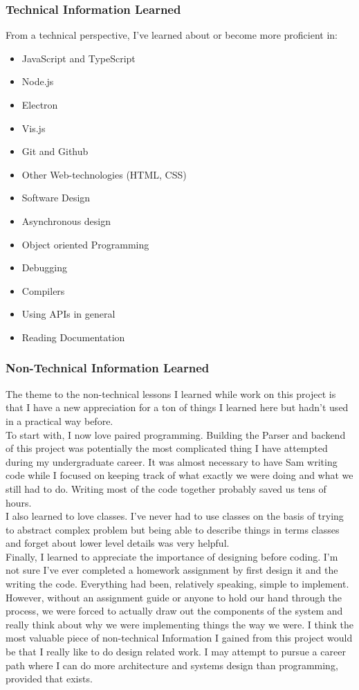 \documentclass[letterpaper,10pt,titlepage,draftclsnofoot,onecolumn,onesided] {IEEEtran}
\begin{document}
\subsubsection{Technical Information Learned}
From a technical perspective, I've learned about or become more proficient in:
\begin{itemize}
    \item JavaScript and TypeScript
    \item Node.js
    \item Electron
    \item Vis.js
    \item Git and Github
    \item Other Web-technologies (HTML, CSS)
    \item Software Design
    \item Asynchronous design
    \item Object oriented Programming
    \item Debugging
    \item Compilers
    \item Using APIs in general
    \item Reading Documentation
\end{itemize}

\subsubsection{Non-Technical Information Learned}
The theme to the non-technical lessons I learned while work on this project is that I have a new appreciation for a ton of things I learned here but hadn’t used in a practical way before.
\\
To start with, I now love paired programming. 
Building the Parser and backend of this project was potentially the most complicated thing I have attempted during my undergraduate career. 
It was almost necessary to have Sam writing code while I focused on keeping track of what exactly we were doing and what we still had to do. 
Writing most of the code together probably saved us tens of hours.
\\
I also learned to love classes. 
I've never had to use classes on the basis of trying to abstract complex problem but being able to describe things in terms classes and forget about lower level details was very helpful.
\\
Finally, I learned to appreciate the importance of designing before coding. 
I'm not sure I've ever completed a homework assignment by first design it and the writing the code. 
Everything had been, relatively speaking, simple to implement. 
However, without an assignment guide or anyone to hold our hand through the process, we were forced to actually draw out the components of the system and really think about why we were implementing things the way we were.
I think the most valuable piece of non-technical Information I gained from this project would be that I really like to do design related work. 
I may attempt to pursue a career path where I can do more architecture and systems design than programming, provided that exists. 
\end{document}
